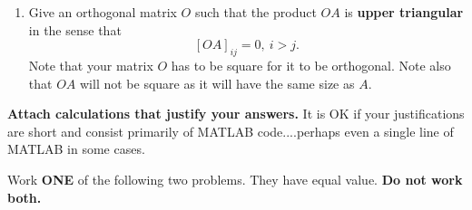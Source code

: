 \documentclass[letterpaper]{article}
\begin{document}
\begin{enumerate}
 \item Give an orthogonal matrix $O$ such that the product $O A$ is \textbf{upper triangular} in the sense that
     $$[OA]_{ij} =0,~ i > j. $$  %
      Note that your matrix $O$ has to be square for it to be orthogonal. Note also that $OA$ will not be square as it will have the same size as $A$.\\


\end{enumerate}

\vspace*{2cm}


\begin{center}
\large
\textbf{Attach calculations that justify your answers.} It is OK if your justifications are short and consist primarily of MATLAB code....perhaps even a single line of MATLAB in some cases.
\end{center}

\newpage


  Work \textbf{ONE} of the following two problems. They have equal value. \textbf{Do not work both.}
\end{document}
